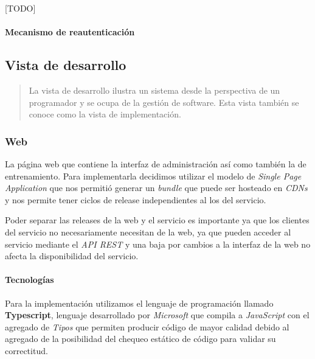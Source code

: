 \documentclass[12pt,a4paper,]{scrartcl}
\let\oldparagraph\paragraph
\renewcommand{\paragraph}[1]{\oldparagraph{#1}\mbox{}}
\begin{document}
{[}TODO{]}

\hypertarget{mecanismo-de-reautenticaciuxf3n}{%
\paragraph{Mecanismo de reautenticación}\label{mecanismo-de-reautenticaciuxf3n}}

\hypertarget{vista-de-desarrollo}{%
\subsection{Vista de desarrollo}\label{vista-de-desarrollo}}

\begin{quote}
La vista de desarrollo ilustra un sistema desde la perspectiva de un programador y se ocupa de la gestión de software.
Esta vista también se conoce como la vista de implementación.
\end{quote}

\hypertarget{web-1}{%
\subsubsection{Web}\label{web-1}}

La página web que contiene la interfaz de administración así como también la de entrenamiento. Para implementarla decidimos utilizar el modelo de \emph{Single Page Application} que nos permitió generar un \emph{bundle} que puede ser hosteado en \emph{CDNs} y nos permite tener ciclos de release independientes al los del servicio.

Poder separar las releases de la web y el servicio es importante ya que los clientes del servicio no necesariamente necesitan de la web, ya que pueden acceder al servicio mediante el \emph{API REST} y una baja por cambios a la interfaz de la web no afecta la disponibilidad del servicio.

\hypertarget{tecnologuxedas}{%
\paragraph{Tecnologías}\label{tecnologuxedas}}

Para la implementación utilizamos el lenguaje de programación llamado \textbf{Typescript}, lenguaje desarrollado por \emph{Microsoft} que compila a \emph{JavaScript} con el agregado de \emph{Tipos} que permiten producir código de mayor calidad debido al agregado de la posibilidad del chequeo estático de código para validar su correctitud.
\end{document}
